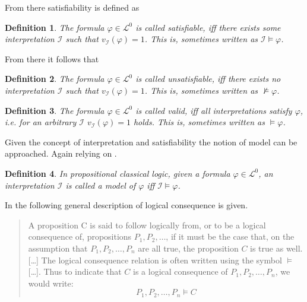\documentclass[11pt,a4paper]{article}
\newtheorem{mydef}{Definition}
\begin{document}
From there satisfiability is defined as 
\begin{mydef}
The formula $\varphi \in \mathcal{L}^0$ is called satisfiable, iff there exists some interpretation $\mathcal{I}$ such that $v_{\mathcal{I}}(\varphi)=1$. This is, sometimes written as $\mathcal{I} \models \varphi$.
\end{mydef}

From there it follows that

\begin{mydef}
The formula $\varphi \in \mathcal{L}^0$ is called unsatisfiable, iff there exists no interpretation $\mathcal{I}$ such that $v_{\mathcal{I}}(\varphi)=1$. This is, sometimes written as $\nvDash \varphi$.
\end{mydef}



\begin{mydef}
The formula $\varphi \in \mathcal{L}^0$ is called valid, iff all interpretations satisfy $\varphi$, i.e.  for an arbitrary $\mathcal{I}$  $v_{\mathcal{I}}(\varphi)=1$ holds. This is, sometimes written as $\models \varphi$.
\end{mydef}




Given the concept of interpretation and satisfiability the notion of model can be approached.
Again relying on \cite{LoCo}.

\begin{mydef}
In propositional classical logic, given a formula $\varphi \in \mathcal{L}^0$, an interpretation $\mathcal{I}$ is called a model of $\varphi$ iff $\mathcal{I} \models \varphi$.
\end{mydef}

In \cite{audi1999cambridge} the following general description of logical consequence is given.

\begin{quote}
A proposition C is said to follow logically from, or to be a logical consequence of, propositions $P_1, P_2,  \dots$, if it must be the case that, on the assumption that $P_1, P_2, \dots, P_n$ are all true, the proposition $C$ is true as well. [\dots]
The logical consequence relation is often written using the symbol $\models$ [\dots]. Thus to indicate that $C$ is a logical consequence of $P_1, P_2, \dots, P_n$, we would write:
\begin{equation*}
P_1, P_2, \dots, P_n \models C
\end{equation*}
\end{quote}
\end{document}
